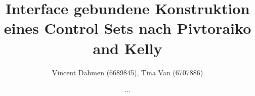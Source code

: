 \documentclass{article}
\begin{document}
\title{Interface gebundene Konstruktion eines Control Sets nach Pivtoraiko and Kelly}
\date{...}
\author{Vincent Dahmen (6689845), Tina Van (6707886)}
\end{document}
